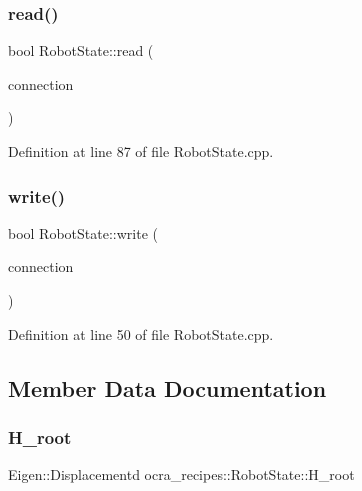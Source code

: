 \subsubsection{\texorpdfstring{read()}{read()}}
{\footnotesize\ttfamily bool Robot\+State\+::read (\begin{DoxyParamCaption}\item[{yarp\+::os\+::\+Connection\+Reader \&}]{connection }\end{DoxyParamCaption})\hspace{0.3cm}{\ttfamily [virtual]}}



Definition at line 87 of file Robot\+State.\+cpp.

\hypertarget{classocra__recipes_1_1RobotState_aa99fa493c3fe185f2018059f35e56164}{}\label{classocra__recipes_1_1RobotState_aa99fa493c3fe185f2018059f35e56164} 
\subsubsection{\texorpdfstring{write()}{write()}}
{\footnotesize\ttfamily bool Robot\+State\+::write (\begin{DoxyParamCaption}\item[{yarp\+::os\+::\+Connection\+Writer \&}]{connection }\end{DoxyParamCaption})\hspace{0.3cm}{\ttfamily [virtual]}}



Definition at line 50 of file Robot\+State.\+cpp.



\subsection{Member Data Documentation}
\hypertarget{classocra__recipes_1_1RobotState_a296aaf0b3131a7d2c2a82b3b8a4cc583}{}\label{classocra__recipes_1_1RobotState_a296aaf0b3131a7d2c2a82b3b8a4cc583} 
\subsubsection{\texorpdfstring{H\+\_\+root}{H\_root}}
{\footnotesize\ttfamily Eigen\+::\+Displacementd ocra\+\_\+recipes\+::\+Robot\+State\+::\+H\+\_\+root}



